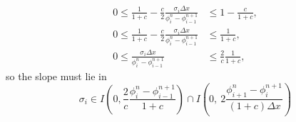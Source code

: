 \documentclass[../thesis.tex]{subfiles}
\begin{document}
\begin{equation}\label{eqn: urc-all c- sufficient}
    \begin{split}
        0
        \leq
        \frac{1}{1+c}
        -\frac{c}{2}
        \frac{\sigma_{i}\Delta x}
        {\phi_{i}^{n} - \phi_{i-1}^{n+1}}
        &\leq
        1 - \frac{c}{1+c},
        \\
        0
        \leq
        \frac{1}{1+c}
        -\frac{c}{2}
        \frac{\sigma_{i}\Delta x}
        {\phi_{i}^{n} - \phi_{i-1}^{n+1}}
        &\leq
        \frac{1}{1+c},
        \\
        0
        \leq
        \frac{\sigma_{i}\Delta x}
        {\phi_{i}^{n} - \phi_{i-1}^{n+1}}
        &\leq
        \frac{2}{c}
        \frac{1}{1+c},
    \end{split}
\end{equation}
so the slope must lie in
\begin{equation}
    \sigma_{i}
    \in
    I\left(
        0,
        \frac{2}{c}
        \frac{\phi_{i}^{n} - \phi_{i-1}^{n+1}}{1+c}
    \right)
    \cap
    I\left(
        0,
        ~2\frac{\phi_{i+1}^{n} - \phi_{i}^{n+1}}{(1+c)\Delta x}
    \right)
\end{equation}
\end{document}
